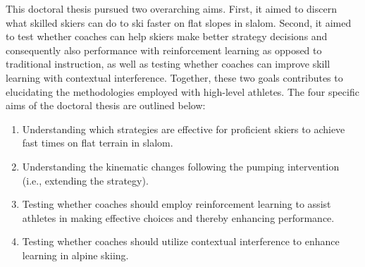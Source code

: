 This doctoral thesis pursued two overarching aims. First, it aimed to discern what skilled skiers can do to ski faster on flat slopes in slalom. Second, it aimed to test whether coaches can help skiers make better strategy decisions and consequently also performance with reinforcement learning as opposed to traditional instruction, as well as testing whether coaches can improve skill learning with contextual interference. Together, these two goals contributes to elucidating the methodologies employed with high-level athletes. The four specific aims of the doctoral thesis are outlined below: 

\begin{enumerate}
    \item Understanding which strategies are effective for proficient skiers to achieve fast times on flat terrain in slalom.
    \item Understanding the kinematic changes following the pumping intervention (i.e., extending the strategy).
    \item Testing whether coaches should employ reinforcement learning to assist athletes in making effective choices and thereby enhancing performance.
    \item Testing whether coaches should utilize contextual interference to enhance learning in alpine skiing.
\end{enumerate}